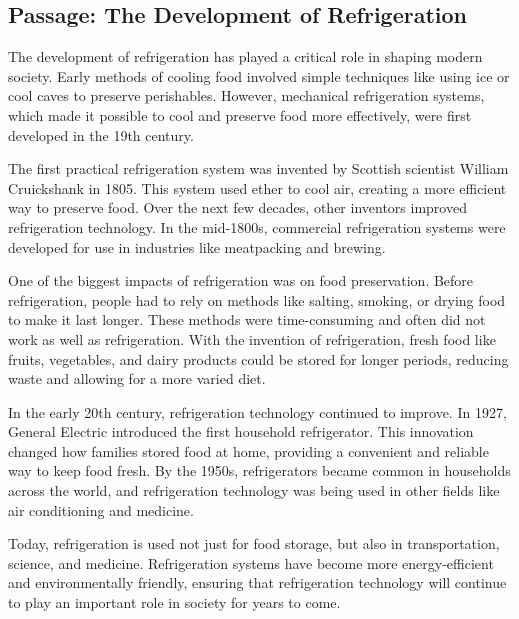 \documentclass[12pt]{article}
\begin{document}
\onehalfspacing

\subsection*{Passage: The Development of Refrigeration}

\begin{tcolorbox}[colframe=black!40, colback=gray!5]
\begin{spacing}{1.15}
    The development of refrigeration has played a critical role in shaping modern society. Early methods of cooling food involved simple techniques like using ice or cool caves to preserve perishables. However, mechanical refrigeration systems, which made it possible to cool and preserve food more effectively, were first developed in the 19th century.

    The first practical refrigeration system was invented by Scottish scientist William Cruickshank in 1805. This system used ether to cool air, creating a more efficient way to preserve food. Over the next few decades, other inventors improved refrigeration technology. In the mid-1800s, commercial refrigeration systems were developed for use in industries like meatpacking and brewing.

    One of the biggest impacts of refrigeration was on food preservation. Before refrigeration, people had to rely on methods like salting, smoking, or drying food to make it last longer. These methods were time-consuming and often did not work as well as refrigeration. With the invention of refrigeration, fresh food like fruits, vegetables, and dairy products could be stored for longer periods, reducing waste and allowing for a more varied diet.

    In the early 20th century, refrigeration technology continued to improve. In 1927, General Electric introduced the first household refrigerator. This innovation changed how families stored food at home, providing a convenient and reliable way to keep food fresh. By the 1950s, refrigerators became common in households across the world, and refrigeration technology was being used in other fields like air conditioning and medicine.

    Today, refrigeration is used not just for food storage, but also in transportation, science, and medicine. Refrigeration systems have become more energy-efficient and environmentally friendly, ensuring that refrigeration technology will continue to play an important role in society for years to come.
\end{spacing}
\end{tcolorbox}
\end{document}
